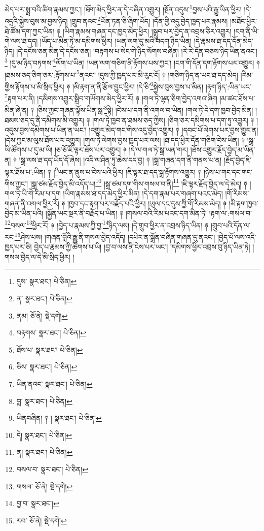 མེད་པར་སྨྲ་བའི་ཚིག་རྣམས་ཀྱང་། །ཐོག་མེད་ཕྱིར་ན་དེ་བཞིན་འགྱུར། །སྔོན་འདུས་\footnote{དུས་  སྣར་ཐང་།  པེ་ཅིན། }བྱས་པའི་རྒྱུ་ཡིན་ཕྱིར། །དེ་འདྲའི་སྐྱེས་བུས་མ་བྱས་ཉིད། །གྲུབ་ནའང་\footnote{ན་  སྣར་ཐང་།  པེ་ཅིན། }ཡོན་ཏན་ཅི་ཞིག་ཡོད། །དོན་གྱི་འདུ་བྱེད་ཁྱད་པར་རྣམས། །མཐོང་ཕྱིར་ཐེ་ཚོམ་དག་ཀྱང་ཡིན། ༈ །ཡིག་རྣམས་གཞན་དང་ཁྱད་མེད་ཕྱིར། །སྒྲུབ་པར་བྱེད་ན་འབྲས་ཅིར་འགྱུར། །ངག་ནི་ཡི་གེ་ལས་ཐ་དད། །ཡོད་པ་མིན་ཏེ་མ་དམིགས་ཕྱིར། །ཡན་ལག་དུ་མའི་བདག་ཉིད་ཡིན། །དེ་རྣམས་ཐ་དད་དོན་མེད་ཉིད། །དེ་དངོས་ཅན་མིན་དེ་དངོས་ཅན། །བརྟགས་པ་སེང་གེ་ཉིད་སོགས་བཞིན། །རེ་རེ་དོན་བཅས་ཉིད་ཡིན་ནའང་།\footnote{ནམ།  ཅོ་ནེ།  སྡེ་དགེ། } །དུ་མ་ཉིད་བཏགས་\footnote{བརྟགས་  སྣར་ཐང་།  པེ་ཅིན། }ལོག་པ་ཡིན། །ཡན་ལག་གཅིག་ནི་རྟོགས་པས་ཀྱང་། །ངག་གི་དོན་དག་རྟོགས་པར་འགྱུར། ༈ །ཐམས་ཅད་ཅིག་ཅར་:རྟོགས་པ་\footnote{ཐོས་པ་  སྣར་ཐང་།  པེ་ཅིན། }ནའང་། །དུས་ཀྱི་ཁྱད་པར་མི་རུང་ངོ། ༈ །གཅིག་ཉིད་ན་ཡང་ཐ་དད་མེད། །རིམ་གྱིས་རྟོགས་པ་མི་སྲིད་ཕྱིར། ༈ །མི་རྟག་ན་ནི་རྩོལ་བྱུང་ཕྱིར། །དེ་ཅི་\footnote{ཅིས་  སྣར་ཐང་།  པེ་ཅིན། }སྐྱེས་བུས་བྱས་པ་མིན། །རྟག་ཉིད་:ཡིན་ཡང་\footnote{ཡིན་ནའང་  སྣར་ཐང་།  པེ་ཅིན། }རྟག་པར་ནི། །དམིགས་འགྱུར་སྒྲིབ་གཡོགས་མེད་ཕྱིར་རོ། ༈ །གལ་ཏེ་ལྷན་ཅིག་བྱེད་འགའ་ཞིག །མ་ཚང་ཐོས་པ་མིན་ཞེ་ན། ༈ །ཅིས་ཀྱང་གཞན་ལྟོས་ཡིན་སླ་\footnote{བླ་  སྣར་ཐང་།  པེ་ཅིན། }སྟེ། །ངེས་པ་དག་ནི་འགལ་བ་ཡིན། །གལ་ཏེ་དེ་དག་ཁྱབ་བྱེད་མིན། །ཐམས་ཅད་དུ་ནི་དམིགས་མི་འགྱུར། ༈ །གལ་ཏེ་ཁྱབ་ན་ཐམས་ཅད་ཀྱིས། །ཅིག་ཅར་དམིགས་པ་དག་ཏུ་འགྱུར། ༈ །འདུས་བྱས་དམིགས་པ་ཡིན་ན་ཡང་། །འགྱུར་མེད་གང་གིས་འདུ་བྱེད་འགྱུར། ༈ །དབང་པོ་ལེགས་པར་བྱས་གྱུར་ན། །དེས་ཀྱང་མ་ལུས་ཐོས་པར་འགྱུར། །གལ་ཏེ་ལེགས་བྱས་ཁྱད་པར་ལས། །ཐ་དད་ཕྱིར་དོན་གཅིག་ངེས་ཡིན། ༈ །སྒྲ་ཡི་ཚོགས་པ་དུ་མ་ཡི། །ཅ་ཅོ་ཇི་ལྟར་ཐོས་པར་འགྱུར། ༈ །དེ་ལ་གལ་ཏེ་སྒྲ་ཡན་གར། །ཐོས་འགྱུར་རྗོད་བྱེད་མ་ཡིན་ན། ༈ །སྒྲ་ལས་ཐ་དད་ཡོད་དོ་ཞེས། །འདི་ལ་ཤིན་ཏུ་ཆེས་དད་བྱ། ༈ །སྒྲ་གཞན་དག་ནི་གནས་པ་ན། །རྗོད་བྱེད་ཇི་ལྟར་ཐོས་པ་:ཡིན། ༈ །\footnote{ཡིནབཞིན། ༈ །  སྣར་ཐང་།  པེ་ཅིན། }ཡང་ན་ནུས་པ་ངེས་པའི་ཕྱིར། །ཇི་ལྟར་ཐ་དད་སྒྲ་རྟོགས་འགྱུར། ༈ །ཉེས་པ་གང་དང་གང་གིས་ཀྱང་། །སྒྲ་ཙམ་རྗོད་བྱེད་མི་འདོད་པ།\footnote{དེ།  སྣར་ཐང་།  པེ་ཅིན། } །སྒྲ་ཙམ་དག་གིས་གསལ་བ་ནི།\footnote{ན།  སྣར་ཐང་།  པེ་ཅིན། } །ཇི་ལྟར་རྗོད་བྱེད་ལ་དེ་མེད། ༈ །གལ་ཏེ་ཡི་གེ་རིམ་པ་དག །ཡིག་རྣམས་ཐ་དད་མེད་ཕྱིར་མིན། །དེ་དག་རྣམ་པར་གཞག་པའང་མེད། །གོ་རིམས་གཞན་ནི་འགལ་ཕྱིར་རོ། ༈ །ཁྱབ་དང་རྟག་པར་བརྗོད་པའི་ཕྱིར། །ཡུལ་དང་དུས་ཀྱི་གོ་རིམས་མེད། ༈ །མི་རྟག་ཁྱབ་བྱེད་མ་ཡིན་པའི། །སྐྱོན་ཡང་སྔར་ནི་བརྗོད་པ་ཡིན། ༈ །གསལ་བའི་རིམ་པའང་དག་མིན་ཏེ། །རྟག་ལ་:གསལ་བ་\footnote{བསལ་བ་  སྣར་ཐང་།  པེ་ཅིན། }བསལ་\footnote{གསལ་  ཅོ་ནེ།  སྡེ་དགེ། }ཕྱིར་རོ། ༈ །བྱེད་པ་རྣམས་ཀྱི་བྱ་\footnote{བྱ་བ་  སྣར་ཐང་། }ཉིད་ལས། །དེ་གྲུབ་ཕྱིར་ན་འབྲས་ཉིད་ཡིན། ༈ །གྲུབ་པའི་དོན་ལ་རང་\footnote{རབ་  ཅོ་ནེ།  སྡེ་དགེ། }ཤེས་པས། །གཞན་བློའི་རྒྱུ་ནི་གསལ་བྱེད་འདོད། །དཔེར་ན་སྒྲོན་བཞིན་གཞན་དུ་ནའང་། །བྱེད་པོ་ལས་འདི་ཁྱད་པར་ཅི། བྱེད་པ་རྣམས་ཀྱི་ཚོགས་པ་ཡི། །བྱ་བ་ལས་ནི་ངེས་པར་ཡང་། །དམིགས་ཕྱིར་འབྲས་བུ་ཉིད་ཡིན་ཏེ། །གསལ་བྱེད་ལ་དེ་མི་སྲིད་ཕྱིར། །
